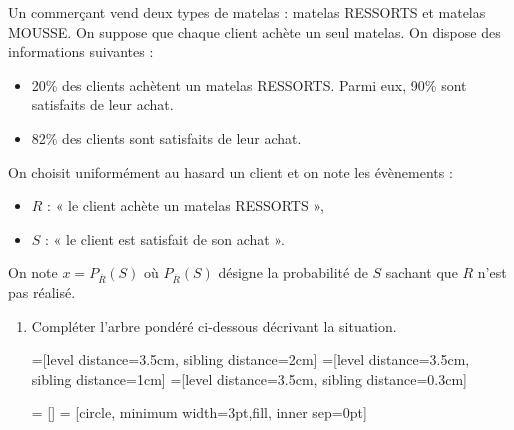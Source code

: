 \documentclass[11pt,fleqn, openany]{book} %
\begin{document}
\begin{exercise}[subtitle={(Réunion 2023)}]
Un commerçant vend deux types de matelas : matelas RESSORTS et matelas MOUSSE. On suppose que chaque client achète un seul matelas. On dispose des informations suivantes :
\begin{itemize}
\item 20\% des clients achètent un matelas RESSORTS. Parmi eux, 90\% sont satisfaits de leur achat.
\item 82\% des clients sont satisfaits de leur achat.\end{itemize}

On choisit uniformément au hasard un client et on note les évènements :
\begin{itemize}
\item $R$ : « le client achète un matelas RESSORTS »,
\item $S$ : « le client est satisfait de son achat ».\end{itemize}
On note $x = P_{\overline{R}}(S)$ où $P_{\overline{R}}(S)$ désigne la probabilité de $S$ sachant que $R$ n'est pas réalisé.
\begin{enumerate}
\item Compléter l'arbre pondéré ci-dessous décrivant la situation.


=[level distance=3.5cm, sibling distance=2cm]
=[level distance=3.5cm, sibling distance=1cm]
=[level distance=3.5cm, sibling distance=0.3cm]

 = []
 = [circle, minimum width=3pt,fill, inner sep=0pt]


\begin{center}
\end{center}


\end{enumerate}
\end{exercise}
\end{document}
